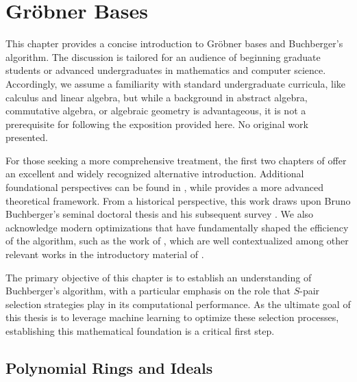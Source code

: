 \chapter{Gröbner Bases}

This chapter provides a concise introduction to Gröbner bases and Buchberger's algorithm. The discussion is tailored for an audience of beginning graduate students or advanced undergraduates in mathematics and computer science. Accordingly, we assume a familiarity with standard undergraduate curricula, like calculus and linear algebra, but while a background in abstract algebra, commutative algebra, or algebraic geometry is advantageous, it is not a prerequisite for following the exposition provided here. No original work presented.

For those seeking a more comprehensive treatment, the first two chapters of \cite{cox2015_IVA} offer an excellent and widely recognized alternative introduction. Additional foundational perspectives can be found in \cite{cox2005_UAG, Kreuzer2000_CAG, Sturmfels2005_WhatIsGB}, while \cite{Adams1994_IGB} provides a more advanced theoretical framework. From a historical perspective, this work draws upon Bruno Buchberger's seminal doctoral thesis \cite{Buchberger1965_algorithmGerman, Buchberger1965_algorithmEnglish} and his subsequent survey \cite{Buchberger1985_SurveyArticle}. We also acknowledge modern optimizations that have fundamentally shaped the efficiency of the algorithm, such as the work of \cite{Gebauer1988_InstallationOfGB, Giovini1991_OneSugarCube, Sun2011_F5InBuchbergersStyle}, which are well contextualized among other relevant works in the introductory material of \cite{Eder2012_SignatureBasedAlgorithms}.

The primary objective of this chapter is to establish an understanding of Buchberger's algorithm, with a particular emphasis on the role that $S$-pair selection strategies play in its computational performance. As the ultimate goal of this thesis is to leverage machine learning to optimize these selection processes, establishing this mathematical foundation is a critical first step.

\section{Polynomial Rings and Ideals}

